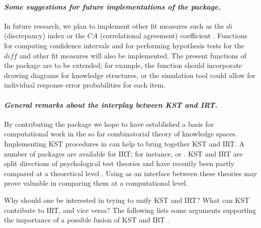\documentclass[nojss]{jss}
\begin{document}
\paragraph{\it Some suggestions for future implementations of the package.}
In future research, we plan to implement other fit measures such as the $\mathit{di}$ (discrepancy)
index \citep{KKVF:94} or the $\mathit{CA}$ (correlational agreement) coefficient \citep{L:74}. 
Functions for computing confidence intervals and for performing hypothesis tests for the 
$\mathit{diff}$ and other fit measures will also be implemented. 
The present functions of the package are to be extended; for example, the function  should incorporate drawing diagrams for knowledge structures, or the simulation tool could allow 
for individual response error probabilities for each item.

\paragraph{\it General remarks about the interplay between KST and IRT.}
By contributing the  package  we hope to have established a basis for computational work in the so far combinatorial theory of knowledge spaces. Implementing KST procedures in  can help to bring together KST and IRT. 
A number of  packages are available for IRT; for instance,  \citep{ltm} or  \citep{mokken}. KST and IRT are split directions of psychological test theories and 
have recently been partly compared at a theoretical level \citep{S:06,SR:09,U:06,U:07}. Using
 as an interface between these theories may prove valuable in comparing them 
at a computational level.

Why should one be interested in trying to unify KST and IRT? 
What can KST contribute to IRT, and vice versa?
The following lists some arguments supporting the importance of a possible fusion 
of KST and IRT \citep[cf.][]{U:07}.
\end{document}

